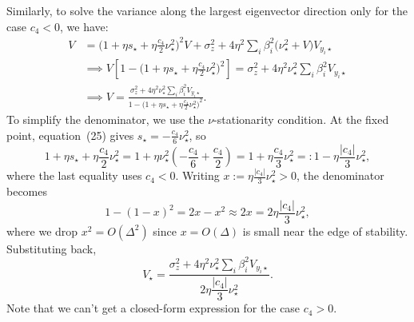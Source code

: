 \documentclass{article} %
\theoremstyle{plain}
\theoremstyle{definition}
\begin{document}
\begin{itemize}[nosep,leftmargin=*]
Similarly, to solve the variance along the largest eigenvector direction only for the case $c_{4}<0$, we have:
\begin{align}
V &= \Big(1+\eta s_\star + \eta\frac{c_4}{2}\nu_\star^2\Big)^{\!2} V
 + \sigma_z^2
 + 4\eta^2\sum_i \beta_i^2\big(\nu_\star^2 + V\big)V_{y_i\star} \\
&\implies V\left[1 - \Big(1+\eta s_\star + \eta\frac{c_4}{2}\nu_\star^2\Big)^{\!2}\right]
= \sigma_z^2 + 4\eta^2\nu_\star^2\sum_i \beta_i^2 V_{y_i\star} \\
&\implies V = \frac{\sigma_z^2 + 4\eta^2\nu_\star^2\sum_i \beta_i^2 V_{y_i\star}}
{1 - \Big(1+\eta s_\star + \eta\frac{c_4}{2}\nu_\star^2\Big)^{\!2}}.
\end{align}
To simplify the denominator, we use the $\nu$-stationarity condition. At the fixed point,
equation~(25) gives $s_\star = -\frac{c_4}{6}\nu_\star^2$, so
\begin{equation}
1 + \eta s_\star + \eta\frac{c_4}{2}\nu_\star^2
= 1 + \eta\nu_\star^2\!\left(-\frac{c_4}{6} + \frac{c_4}{2}\right)
= 1 + \eta\frac{c_4}{3}\nu_\star^2
=: 1 - \eta\frac{|c_4|}{3}\nu_\star^2,
\end{equation}
where the last equality uses $c_4 < 0$. Writing $x := \eta\frac{|c_4|}{3}\nu_\star^2 > 0$,
the denominator becomes
\begin{equation}
1 - (1-x)^2 = 2x - x^2 \approx 2x = 2\eta\frac{|c_4|}{3}\nu_\star^2,
\end{equation}
where we drop $x^2 = O(\Delta^2)$ since $x = O(\Delta)$ is small near the edge of stability.
Substituting back,
\begin{equation}
\boxed{V_\star = \frac{\sigma_z^2 + 4\eta^2\nu_\star^2\sum_i \beta_i^2 V_{y_i\star}}
{2\eta\dfrac{|c_4|}{3}\nu_\star^2}.}
\end{equation}
Note that we can't get a closed-form expression for the case $c_{4}>0$. 
 

\end{itemize}
\end{document}

